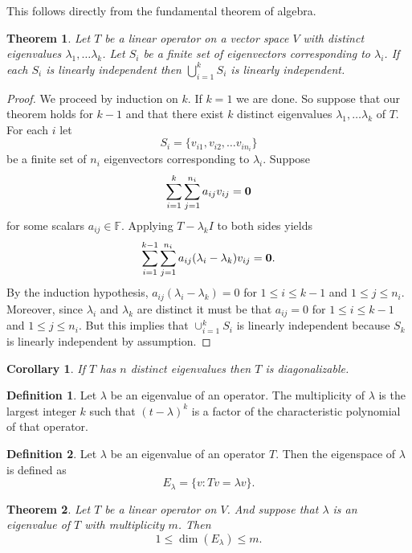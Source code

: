 \documentclass[oneside, 12pt]{book}
\newtheorem{thm}{Theorem}[section]
\newtheorem{cor}{Corollary}[section]
\theoremstyle{definition}
\newtheorem{defn}{Definition}[section]
\begin{document}
This follows directly from the fundamental theorem of algebra.
\begin{thm}
  \label{thm_eigenind}
  Let $T$ be a linear operator on a vector space $V$ with distinct eigenvalues $\lambda_{1}, \dots \lambda_{k}$. Let $S_{i}$ be a finite set of eigenvectors corresponding to $\lambda_{i}$. If each $S_{i}$ is linearly independent then $\bigcup_{i=1}^{k}S_{i}$ is linearly independent.
\end{thm}
\begin{proof}
  We proceed by induction on $k$. If $k=1$ we are done. So suppose that our theorem holds for $k-1$ and that there exist $k$ distinct eigenvalues $\lambda_{1}, \dots \lambda_{k}$ of $T$. For each $i$ let \[S_{i}=\{v_{i1}, v_{i2}, \dots v_{in_{i}}\}\] be a finite set of $n_{i}$ eigenvectors corresponding to $\lambda_{i}$. Suppose \[\sum_{i=1}^{k}\sum_{j=1}^{n_{i}}a_{ij}v_{ij}=\bold{0}\] for some scalars $a_{ij} \in \mathbb{F}$. Applying $T-\lambda_{k}I$ to both sides yields
  \[\sum_{i=1}^{k-1}\sum_{j=1}^{n_{i}}a_{ij}(\lambda_{i}-\lambda_{k})v_{ij}=\bold{0}.\]
  By the induction hypothesis, $a_{ij}(\lambda_{i}-\lambda_{k})=0$ for $1\leq i \leq k-1$ and $1 \leq j \leq n_{i}$. Moreover, since $\lambda_{i}$ and $\lambda_{k}$ are distinct it must be that $a_{ij}=0$ for $1 \leq i \leq k-1$ and $1 \leq j \leq n_{i}$. But this implies that $\cup_{i=1}^{k}S_{i}$ is linearly independent because $S_{k}$ is linearly independent by assumption.
\end{proof}
\begin{cor}
  \label{cor_diseign}
If $T$ has $n$ distinct eigenvalues then $T$ is diagonalizable.
\end{cor}
\begin{defn}
  \label{defn_mult}
Let $\lambda$ be an eigenvalue of an operator. The multiplicity of $\lambda$ is the largest integer $k$ such that $(t-\lambda)^{k}$ is a factor of the characteristic polynomial of that operator.
\end{defn}
\begin{defn}
\label{defn_eigensp}
Let $\lambda$ be an eigenvalue of an operator $T$. Then the eigenspace of $\lambda$ is defined as \[E_{\lambda}=\{v: Tv=\lambda v\}.\]
\end{defn}
\begin{thm}
\label{thm_dimeigen}
Let $T$ be a linear operator on $V$. And suppose that $\lambda$ is an eigenvalue of $T$ with multiplicity $m$. Then \[1 \leq \dim(E_{\lambda}) \leq m.\]
\end{thm}
\end{document}
